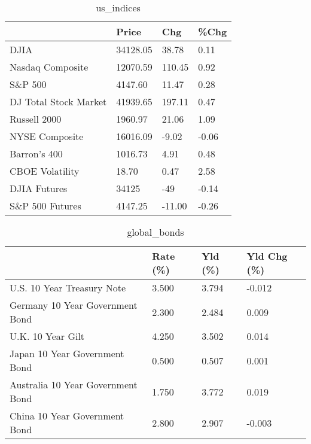 \documentclass{article}%
\begin{document}
%


\begin{table}[htbp]%
\caption{us\_indices}%
\centering%
\begin{adjustbox}{width=1\textwidth}%
\begin{tabular}{llll}
\toprule
                      &    Price &    Chg &  \%Chg \\
\midrule
                 DJIA & 34128.05 &  38.78 &  0.11 \\
     Nasdaq Composite & 12070.59 & 110.45 &  0.92 \\
              S\&P 500 &  4147.60 &  11.47 &  0.28 \\
DJ Total Stock Market & 41939.65 & 197.11 &  0.47 \\
         Russell 2000 &  1960.97 &  21.06 &  1.09 \\
       NYSE Composite & 16016.09 &  -9.02 & -0.06 \\
         Barron's 400 &  1016.73 &   4.91 &  0.48 \\
      CBOE Volatility &    18.70 &   0.47 &  2.58 \\
         DJIA Futures &    34125 &    -49 & -0.14 \\
      S\&P 500 Futures &  4147.25 & -11.00 & -0.26 \\
\bottomrule
\end{tabular}
%
\end{adjustbox}%
\end{table}

%


\begin{table}[htbp]%
\caption{global\_bonds}%
\centering%
\begin{adjustbox}{width=1\textwidth}%
\begin{tabular}{llll}
\toprule
                                  & Rate (\%) & Yld (\%) & Yld Chg (\%) \\
\midrule
       U.S. 10 Year Treasury Note &    3.500 &   3.794 &      -0.012 \\
  Germany 10 Year Government Bond &    2.300 &   2.484 &       0.009 \\
                U.K. 10 Year Gilt &    4.250 &   3.502 &       0.014 \\
    Japan 10 Year Government Bond &    0.500 &   0.507 &       0.001 \\
Australia 10 Year Government Bond &    1.750 &   3.772 &       0.019 \\
    China 10 Year Government Bond &    2.800 &   2.907 &      -0.003 \\
\bottomrule
\end{tabular}
%
\end{adjustbox}%
\end{table}
\end{document}
